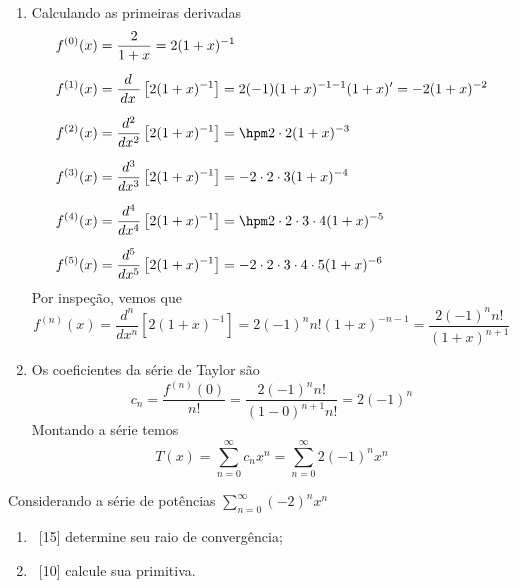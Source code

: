 \documentclass[a4paper,12pt,fleqn]{article}
\begin{document}
\begin{answer}
  \begin{enumerate}[label=\alph*)]
    \item Calculando as primeiras derivadas
    \begin{align*}
      f^{(0)}(x) & = \frac{2}{1+x} = 2(1+x)^{-1} \\[2mm]
      f^{(1)}(x) & = \frac{\,d\;}{\,dx\;}\left[2(1+x)^{-1}\right]
      = 2(-1)(1+x)^{-1-1} (1+x)'
      = -2 (1+x)^{-2} \\[2mm]
      f^{(2)}(x) & = \frac{d^2}{dx^2}\left[2(1+x)^{-1}\right]
      = \hpm 2 \cdot 2                 (1+x)^{-3} \\[2mm]
      f^{(3)}(x) & = \frac{d^3}{dx^3}\left[2(1+x)^{-1}\right]
      = -2 \cdot 2 \cdot 3         (1+x)^{-4} \\[2mm]
      f^{(4)}(x) & = \frac{d^4}{dx^4}\left[2(1+x)^{-1}\right]
      = \hpm 2 \cdot 2 \cdot 3 \cdot 4 (1+x)^{-5} \\[2mm]
      f^{(5)}(x) & = \frac{d^5}{dx^5}\left[2(1+x)^{-1}\right]
      = - 2 \cdot 2 \cdot 3 \cdot 4 \cdot 5 (1+x)^{-6}
    \end{align*}
    Por inspeção, vemos que
    \[
      f^{(n)}(x)
      = \frac{d^n}{dx^n}\left[2(1+x)^{-1}\right]
      = 2(-1)^n n! (1+x)^{-n-1}
      = \frac{2 (-1)^n n!}{(1+x)^{n+1}}
    \]
    \item Os coeficientes da série de Taylor são
    \[
      c_n
      = \frac{f^{(n)}(0)}{n!}
      = \frac{2(-1)^n n!}{(1-0)^{n+1}n!}
      = 2(-1)^n
    \]
    Montando a série temos
    \[
      T(x)
      = \sum_{n=0}^\infty c_n x^n
      = \sum_{n=0}^\infty 2(-1)^n x^n
    \]
  \end{enumerate}
\end{answer}


Considerando a série de potências
\(
  \sum_{n=0}^\infty (-2)^n x^n
\)
\begin{enumerate}[label=\alph*)]
  \item\ [15] determine seu raio de convergência;
  \item\ [10] calcule sua primitiva.
\end{enumerate}
\end{document}
